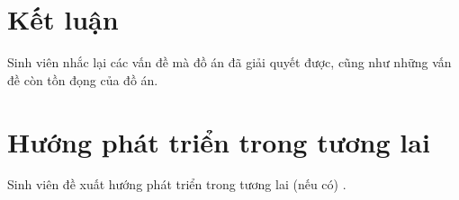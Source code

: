 \documentclass[../main.tex]{subfiles}
\begin{document}
\section{Kết luận}

Sinh viên nhắc lại các vấn đề mà đồ án đã giải quyết được, cũng như những vấn đề còn tồn đọng của đồ án.  

\section{Hướng phát triển trong tương lai}

Sinh viên đề xuất hướng phát triển trong tương lai (nếu có) .  
\end{document}

